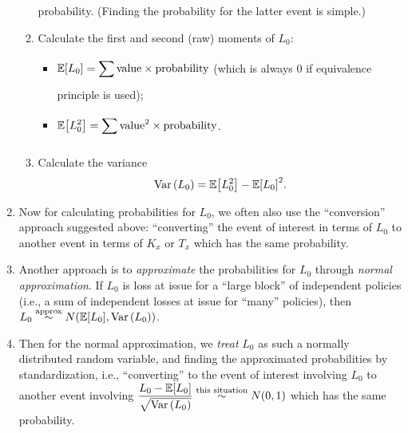 \begin{enumerate}
\begin{enumerate}
\begin{note}
{probability}. (Finding the probability for the latter event is simple.)
\end{note}
\item Calculate the first and second (raw) moments of \(L_0\):
\begin{itemize}
\item \(\displaystyle
\mathbb{E}\qty[L_0]=\sum_{}^{}\text{value}\times\text{probability}\) (which is always 0
if equivalence principle is used);
\item \(\displaystyle \mathbb{E}\qty[L_0^2]=\sum_{}^{}\text{value}^2\times\text{probability}\).
\end{itemize}
\item Calculate the variance
\[
\operatorname{Var}\qty(L_0)=\mathbb{E}\qty[L_0^2]-\mathbb{E}\qty[L_0]^2.
\]
\end{enumerate}
\item \label{it:cal-loss-prob}
Now for calculating probabilities for \(L_0\), we often also use the
``conversion'' approach suggested above: ``converting'' the event of interest
in terms of \(L_0\) to another event in terms of \(K_x\) or \(T_x\) which has
the same probability.

\item \label{it:approx-loss-prob}
Another approach is to \emph{approximate} the probabilities for \(L_0\)
through \emph{normal approximation}. If \(L_0\) is loss at issue for a ``large
block'' of independent policies (i.e., a sum of independent losses at issue for
``many'' policies), then \(L_0\overset{\text{approx}}{\sim} N(\mathbb{E}\qty[L_0],\operatorname{Var}\qty(L_0))\).

\item Then for the normal approximation, we \emph{treat} \(L_0\) as such a
normally distributed random variable, and finding the approximated
probabilities by standardization, i.e., ``converting'' to the event of interest
involving \(L_0\) to another event involving \(\displaystyle
\frac{L_0-\mathbb{E}\qty[L_0]}{\sqrt{\operatorname{Var}\qty(L_0)}}\overset{\text{this situation}}{\sim} N(0,1)\)
which has the same probability.
\end{enumerate}

